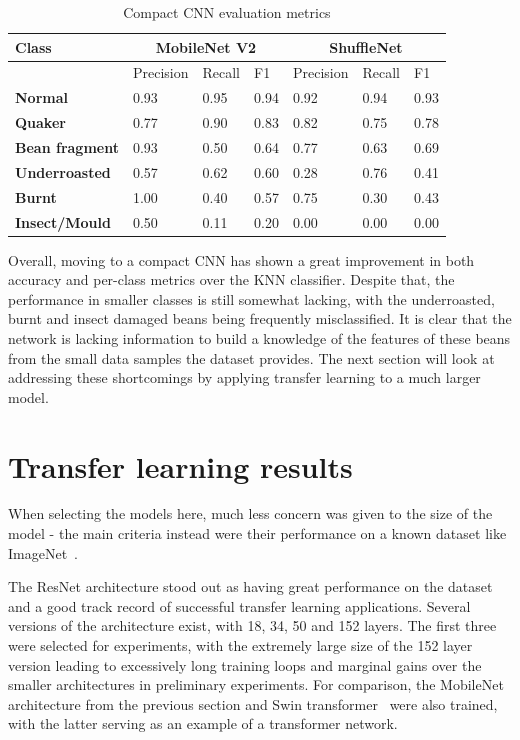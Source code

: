 \begin{table}
    \centering
    \begin{tabular}{*7l}
        \toprule
        \textbf{Class} & \multicolumn{3}{c}{MobileNet V2} & \multicolumn{3}{c}{ShuffleNet} \\
        \midrule
        {} & Precision & Recall & F1 & Precision & Recall & F1 \\
        \textbf{Normal} & 0.93 & 0.95 & 0.94 & 0.92 & 0.94 & 0.93  \\
        \textbf{Quaker} & 0.77 & 0.90 & 0.83 & 0.82 & 0.75 & 0.78 \\
        \textbf{Bean fragment} & 0.93 & 0.50 & 0.64 & 0.77 & 0.63 & 0.69 \\
        \textbf{Underroasted} & 0.57 & 0.62 & 0.60 & 0.28 & 0.76 & 0.41 \\
        \textbf{Burnt} & 1.00 & 0.40 & 0.57 & 0.75 & 0.30 & 0.43 \\
        \textbf{Insect/Mould} & 0.50 & 0.11 & 0.20 & 0.00 & 0.00 & 0.00  \\
        \bottomrule
    \end{tabular}
    \caption{Compact CNN evaluation metrics}
    \label{tab:cnn-small-scores}
\end{table}

Overall, moving to a compact CNN has shown a great improvement in both accuracy and per-class metrics over the KNN
classifier.
Despite that, the performance in smaller classes is still somewhat lacking, with the underroasted, burnt and insect damaged
beans being frequently misclassified.
It is clear that the network is lacking information to build a knowledge of the features of these beans from the small
data samples the dataset provides.
The next section will look at addressing these shortcomings by applying transfer learning to a much larger model.
\section{Transfer learning results}
\label{sec:transfer-learning-results}
When selecting the models here, much less concern was given to the size of the model - the main criteria instead were
their performance on a known dataset like ImageNet~\cite{imageNet}.

The ResNet architecture stood out as having great performance on the dataset and a good track record of successful
transfer learning applications.
Several versions of the architecture exist, with 18, 34, 50 and 152 layers.
The first three were selected for experiments, with the extremely large size of the 152 layer version leading to excessively long
training loops and marginal gains over the smaller architectures in preliminary experiments.
For comparison, the MobileNet architecture from the previous section and Swin transformer~\cite{swinTransformer} were also trained,
with the latter serving as an example of a transformer network.

